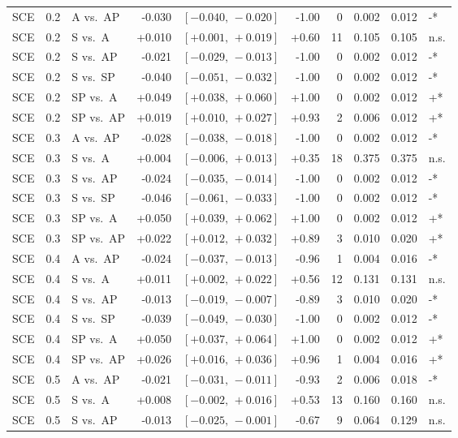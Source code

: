 \begin{landscape}
\begin{scriptsize}
\begin{longtable}{lllrrrrrrl}
SCE & 0.2 & A vs.\ AP & -0.030 & $[-0.040,\,-0.020]$ & -1.00 & 0 & 0.002 & 0.012 & -* \\
SCE & 0.2 & S vs.\ A & +0.010 & $[+0.001,\,+0.019]$ & +0.60 & 11 & 0.105 & 0.105 & n.s. \\
SCE & 0.2 & S vs.\ AP & -0.021 & $[-0.029,\,-0.013]$ & -1.00 & 0 & 0.002 & 0.012 & -* \\
SCE & 0.2 & S vs.\ SP & -0.040 & $[-0.051,\,-0.032]$ & -1.00 & 0 & 0.002 & 0.012 & -* \\
SCE & 0.2 & SP vs.\ A & +0.049 & $[+0.038,\,+0.060]$ & +1.00 & 0 & 0.002 & 0.012 & +* \\
SCE & 0.2 & SP vs.\ AP & +0.019 & $[+0.010,\,+0.027]$ & +0.93 & 2 & 0.006 & 0.012 & +* \\
SCE & 0.3 & A vs.\ AP & -0.028 & $[-0.038,\,-0.018]$ & -1.00 & 0 & 0.002 & 0.012 & -* \\
SCE & 0.3 & S vs.\ A & +0.004 & $[-0.006,\,+0.013]$ & +0.35 & 18 & 0.375 & 0.375 & n.s. \\
SCE & 0.3 & S vs.\ AP & -0.024 & $[-0.035,\,-0.014]$ & -1.00 & 0 & 0.002 & 0.012 & -* \\
SCE & 0.3 & S vs.\ SP & -0.046 & $[-0.061,\,-0.033]$ & -1.00 & 0 & 0.002 & 0.012 & -* \\
SCE & 0.3 & SP vs.\ A & +0.050 & $[+0.039,\,+0.062]$ & +1.00 & 0 & 0.002 & 0.012 & +* \\
SCE & 0.3 & SP vs.\ AP & +0.022 & $[+0.012,\,+0.032]$ & +0.89 & 3 & 0.010 & 0.020 & +* \\
SCE & 0.4 & A vs.\ AP & -0.024 & $[-0.037,\,-0.013]$ & -0.96 & 1 & 0.004 & 0.016 & -* \\
SCE & 0.4 & S vs.\ A & +0.011 & $[+0.002,\,+0.022]$ & +0.56 & 12 & 0.131 & 0.131 & n.s. \\
SCE & 0.4 & S vs.\ AP & -0.013 & $[-0.019,\,-0.007]$ & -0.89 & 3 & 0.010 & 0.020 & -* \\
SCE & 0.4 & S vs.\ SP & -0.039 & $[-0.049,\,-0.030]$ & -1.00 & 0 & 0.002 & 0.012 & -* \\
SCE & 0.4 & SP vs.\ A & +0.050 & $[+0.037,\,+0.064]$ & +1.00 & 0 & 0.002 & 0.012 & +* \\
SCE & 0.4 & SP vs.\ AP & +0.026 & $[+0.016,\,+0.036]$ & +0.96 & 1 & 0.004 & 0.016 & +* \\
SCE & 0.5 & A vs.\ AP & -0.021 & $[-0.031,\,-0.011]$ & -0.93 & 2 & 0.006 & 0.018 & -* \\
SCE & 0.5 & S vs.\ A & +0.008 & $[-0.002,\,+0.016]$ & +0.53 & 13 & 0.160 & 0.160 & n.s. \\
SCE & 0.5 & S vs.\ AP & -0.013 & $[-0.025,\,-0.001]$ & -0.67 & 9 & 0.064 & 0.129 & n.s. \\

\end{longtable}
\end{scriptsize}
\end{landscape}
